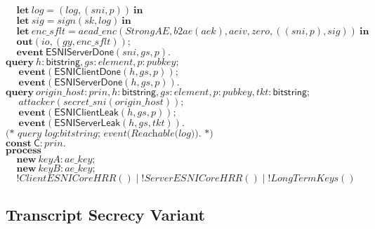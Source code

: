 \documentclass{article}
\theoremstyle{definition}
\newcommand{\kwl}[1]{\mathbf{#1}}
\newcommand{\kwc}[1]{\mathsf{#1}}
\newcommand{\kwt}[1]{\mathsf{#1}}
\newcommand{\kwe}[1]{\mathsf{#1}}
\newcommand{\var}[1]{\mathit{#1}}
\theoremstyle{definition}
\begin{document}
\begin{tabbing}
$\ \ \ \ \ \kwl{let}\ \var{log} = (\var{log}, (\var{sni}, \var{p}))\ \kwl{in} $\\
$\ \ \ \ \ \kwl{let}\ \var{sig} = \var{sign}(\var{sk}, \var{log})\ \kwl{in} $\\
$\ \ \ \ \ \kwl{let}\ \var{enc{\_}sflt} = \var{aead{\_}enc}(\var{StrongAE}, \var{b2ae}(\var{aek}), \var{aeiv}, \var{zero}, ((\var{sni}, \var{p}), \var{sig}))\ \kwl{in} $\\
$\ \ \ \ \ \kwl{out}(\var{io}, (\var{gy}, \var{enc{\_}sflt})); $\\
$\ \ \ \ \ \kwl{event}\ \kwe{ESNIServerDone}(\var{sni}, \var{gs}, \var{p}). $\\
$ $\\
$\kwl{query}\ \var{h}{:}\kwt{bitstring}, \var{gs}{:}\var{element}, \var{p}{:}\var{pubkey}; $\\
$\ \ \ \ \ \ \kwl{event}(\kwe{ESNIClientDone}(\var{h}, \var{gs}, \var{p})); $\\
$\ \ \ \ \ \ \kwl{event}(\kwe{ESNIServerDone}(\var{h}, \var{gs}, \var{p})). $\\
$ $\\
$\kwl{query}\ \var{origin{\_}host}{:}\var{prin}, \var{h}{:}\kwt{bitstring}, \var{gs}{:}\var{element}, \var{p}{:}\var{pubkey}, \var{tkt}{:}\kwt{bitstring}; $\\
$\ \ \ \ \ \ \var{attacker}(\var{secret{\_}sni}(\var{origin{\_}host})); $\\
$\ \ \ \ \ \ \kwl{event}(\kwe{ESNIClientLeak}(\var{h}, \var{gs}, \var{p})); $\\
$\ \ \ \ \ \ \kwl{event}(\kwe{ESNIServerLeak}(\var{h}, \var{gs}, \var{tkt})). $\\
$ $\\
$\textit{(* query log:bitstring; event(Reachable(log)). *)} $\\
$ $\\
$\kwl{const}\ \kwc{C}{:}\var{prin}. $\\
$\kwl{process} $\\
$\ \ \ \ \ \kwl{new}\ \var{keyA}{:}\var{ae{\_}key}; $\\
$\ \ \ \ \ \kwl{new}\ \var{keyB}{:}\var{ae{\_}key}; $\\
$\ \ \ \ \ !\var{ClientESNICoreHRR}()\mid!\var{ServerESNICoreHRR}()\mid!\var{LongTermKeys}() $\\
$$
\end{tabbing}

\subsection{Transcript Secrecy Variant}
\end{document}
